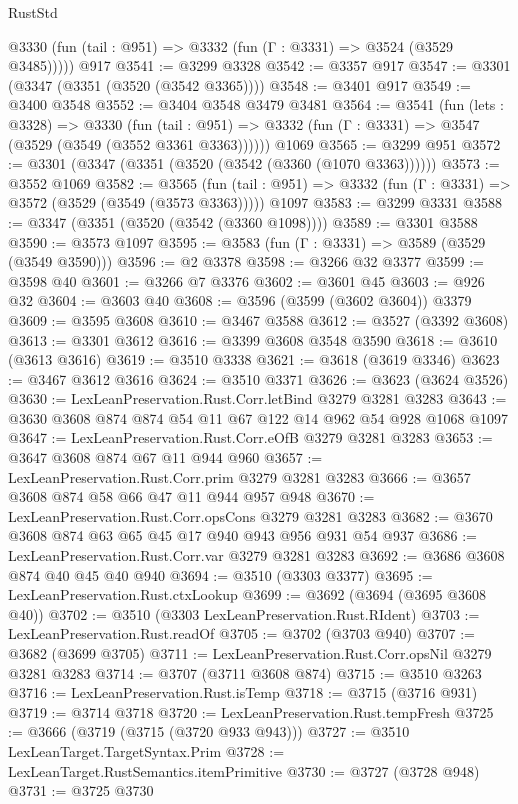 \begin{lexlean}{RustStd}
\begin{coremodule}
      @3330 (fun (tail : @951) => @3332 (fun (Γ : @3331) => @3524 (@3529 @3485)))))
    @917
@3541 := @3299 @3328
@3542 := @3357 @917
@3547 := @3301 (@3347 (@3351 (@3520 (@3542 @3365))))
@3548 := @3401 @917
@3549 := @3400 @3548
@3552 := @3404 @3548 @3479 @3481
@3564 := @3541
    (fun (lets : @3328) =>
    @3330
      (fun (tail : @951) => @3332 (fun (Γ : @3331) => @3547 (@3529 (@3549 (@3552 @3361 @3363))))))
    @1069
@3565 := @3299 @951
@3572 := @3301 (@3347 (@3351 (@3520 (@3542 (@3360 (@1070 @3363))))))
@3573 := @3552 @1069
@3582 := @3565
    (fun (tail : @951) => @3332 (fun (Γ : @3331) => @3572 (@3529 (@3549 (@3573 @3363)))))
    @1097
@3583 := @3299 @3331
@3588 := @3347 (@3351 (@3520 (@3542 (@3360 @1098))))
@3589 := @3301 @3588
@3590 := @3573 @1097
@3595 := @3583 (fun (Γ : @3331) => @3589 (@3529 (@3549 @3590)))
@3596 := @2 @3378
@3598 := @3266 @32 @3377
@3599 := @3598 @40
@3601 := @3266 @7 @3376
@3602 := @3601 @45
@3603 := @926 @32
@3604 := @3603 @40
@3608 := @3596 (@3599 (@3602 @3604)) @3379
@3609 := @3595 @3608
@3610 := @3467 @3588
@3612 := @3527 (@3392 @3608)
@3613 := @3301 @3612
@3616 := @3399 @3608 @3548 @3590
@3618 := @3610 (@3613 @3616)
@3619 := @3510 @3338
@3621 := @3618 (@3619 @3346)
@3623 := @3467 @3612 @3616
@3624 := @3510 @3371
@3626 := @3623 (@3624 @3526)
@3630 := LexLeanPreservation.Rust.Corr.letBind @3279 @3281 @3283
@3643 := @3630 @3608 @874 @874 @54 @11 @67 @122 @14 @962 @54 @928 @1068 @1097
@3647 := LexLeanPreservation.Rust.Corr.eOfB @3279 @3281 @3283
@3653 := @3647 @3608 @874 @67 @11 @944 @960
@3657 := LexLeanPreservation.Rust.Corr.prim @3279 @3281 @3283
@3666 := @3657 @3608 @874 @58 @66 @47 @11 @944 @957 @948
@3670 := LexLeanPreservation.Rust.Corr.opsCons @3279 @3281 @3283
@3682 := @3670 @3608 @874 @63 @65 @45 @17 @940 @943 @956 @931 @54 @937
@3686 := LexLeanPreservation.Rust.Corr.var @3279 @3281 @3283
@3692 := @3686 @3608 @874 @40 @45 @40 @940
@3694 := @3510 (@3303 @3377)
@3695 := LexLeanPreservation.Rust.ctxLookup
@3699 := @3692 (@3694 (@3695 @3608 @40))
@3702 := @3510 (@3303 LexLeanPreservation.Rust.RIdent)
@3703 := LexLeanPreservation.Rust.readOf
@3705 := @3702 (@3703 @940)
@3707 := @3682 (@3699 @3705)
@3711 := LexLeanPreservation.Rust.Corr.opsNil @3279 @3281 @3283
@3714 := @3707 (@3711 @3608 @874)
@3715 := @3510 @3263
@3716 := LexLeanPreservation.Rust.isTemp
@3718 := @3715 (@3716 @931)
@3719 := @3714 @3718
@3720 := LexLeanPreservation.Rust.tempFresh
@3725 := @3666 (@3719 (@3715 (@3720 @933 @943)))
@3727 := @3510 LexLeanTarget.TargetSyntax.Prim
@3728 := LexLeanTarget.RustSemantics.itemPrimitive
@3730 := @3727 (@3728 @948)
@3731 := @3725 @3730

\end{coremodule}
\end{lexlean}
